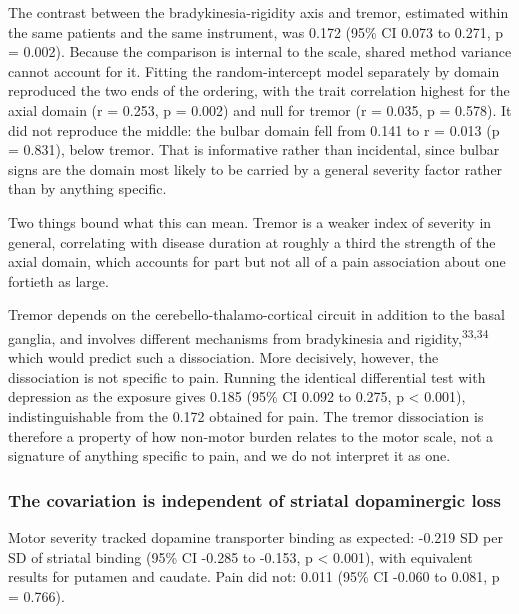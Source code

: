 \documentclass[
  english,
  12pt,
]{article}
\begin{document}
The contrast between the bradykinesia-rigidity axis and tremor, estimated within the same patients and the same instrument, was 0.172 (95\% CI 0.073 to 0.271, p = 0.002). Because the comparison is internal to the scale, shared method variance cannot account for it. Fitting the random-intercept model separately by domain reproduced the two ends of the ordering, with the trait correlation highest for the axial domain (r = 0.253, p = 0.002) and null for tremor (r = 0.035, p = 0.578). It did not reproduce the middle: the bulbar domain fell from 0.141 to r = 0.013 (p = 0.831), below tremor. That is informative rather than incidental, since bulbar signs are the domain most likely to be carried by a general severity factor rather than by anything specific.

Two things bound what this can mean. Tremor is a weaker index of severity in general, correlating with disease duration at roughly a third the strength of the axial domain, which accounts for part but not all of a pain association about one fortieth as large.

Tremor depends on the cerebello-thalamo-cortical circuit in addition to the basal ganglia, and involves different mechanisms from bradykinesia and rigidity,\textsuperscript{33,34} which would predict such a dissociation. More decisively, however, the dissociation is not specific to pain. Running the identical differential test with depression as the exposure gives 0.185 (95\% CI 0.092 to 0.275, p \textless{} 0.001), indistinguishable from the 0.172 obtained for pain. The tremor dissociation is therefore a property of how non-motor burden relates to the motor scale, not a signature of anything specific to pain, and we do not interpret it as one.

\subsubsection{The covariation is independent of striatal dopaminergic loss}\label{the-covariation-is-independent-of-striatal-dopaminergic-loss}

Motor severity tracked dopamine transporter binding as expected: -0.219 SD per SD of striatal binding (95\% CI -0.285 to -0.153, p \textless{} 0.001), with equivalent results for putamen and caudate. Pain did not: 0.011 (95\% CI -0.060 to 0.081, p = 0.766).
\end{document}
